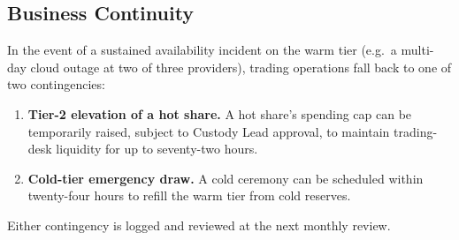 \subsection{Business Continuity}

In the event of a sustained availability incident on the warm tier
(e.g.\ a multi-day cloud outage at two of three providers), trading
operations fall back to one of two contingencies:

\begin{enumerate}[nosep]
\item \textbf{Tier-2 elevation of a hot share.} A hot share's
spending cap can be temporarily raised, subject to Custody Lead
approval, to maintain trading-desk liquidity for up to seventy-two
hours.
\item \textbf{Cold-tier emergency draw.} A cold ceremony can be
scheduled within twenty-four hours to refill the warm tier from
cold reserves.
\end{enumerate}

Either contingency is logged and reviewed at the next monthly review.

